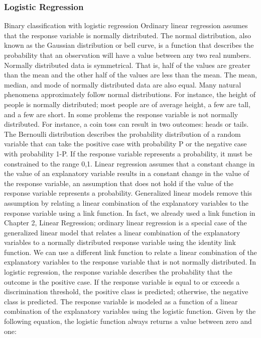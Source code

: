 \begin{frame}\frametitle{Logistic Regression}
Binary classification with logistic
regression
Ordinary linear regression assumes that the response variable is normally distributed.
The normal distribution, also known as the Gaussian distribution or bell curve, is a
function that describes the probability that an observation will have a value between
any two real numbers. Normally distributed data is symmetrical. That is, half of the
values are greater than the mean and the other half of the values are less than the
mean. The mean, median, and mode of normally distributed data are also equal.
Many natural phenomena approximately follow normal distributions. For instance,
the height of people is normally distributed; most people are of average height, a few
are tall, and a few are short.
In some problems the response variable is not normally distributed. For instance,
a coin toss can result in two outcomes: heads or tails. The Bernoulli distribution
describes the probability distribution of a random variable that can take the positive
case with probability P or the negative case with probability 1-P. If the response
variable represents a probability, it must be constrained to the range {0,1}. Linear
regression assumes that a constant change in the value of an explanatory variable
results in a constant change in the value of the response variable, an assumption
that does not hold if the value of the response variable represents a probability.
Generalized linear models remove this assumption by relating a linear combination
of the explanatory variables to the response variable using a link function. In fact,
we already used a link function in Chapter 2, Linear Regression; ordinary linear
regression is a special case of the generalized linear model that relates a linear
combination of the explanatory variables to a normally distributed response variable
using the identity link function. We can use a different link function to relate a
linear combination of the explanatory variables to the response variable that is not
normally distributed.
In logistic regression, the response variable describes the probability that the outcome
is the positive case. If the response variable is equal to or exceeds a discrimination
threshold, the positive class is predicted; otherwise, the negative class is predicted. The
response variable is modeled as a function of a linear combination of the explanatory
variables using the logistic function. Given by the following equation, the logistic
function always returns a value between zero and one:

\end{frame}
